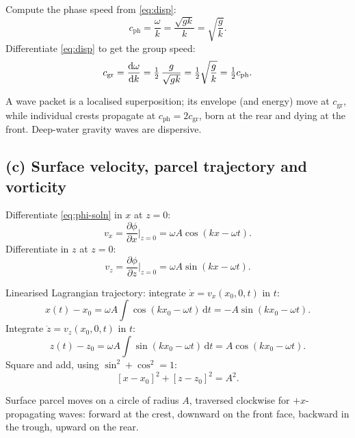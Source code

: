 \documentclass[11pt]{article}
\newcommand{\de}{\mathrm{d}}
\newcommand{\pd}[2]{\frac{\partial #1}{\partial #2}}
\begin{document}
Compute the phase speed from \eqref{eq:disp}:
\[ c_\text{ph} = \frac{\omega}{k} = \frac{\sqrt{gk}}{k} = \sqrt{\frac{g}{k}}. \]
Differentiate \eqref{eq:disp} to get the group speed:
\[ c_\text{gr} = \dv{\omega}{k} = \tfrac12\,\frac{g}{\sqrt{gk}} = \tfrac12\sqrt{\frac{g}{k}} = \tfrac12 c_\text{ph}. \]

\begin{center}
\end{center}
A wave packet is a localised superposition; its envelope (and energy) move at $c_\text{gr}$, while individual crests propagate at $c_\text{ph}=2c_\text{gr}$, born at the rear and dying at the front. Deep-water gravity waves are dispersive.

\subsection*{(c) Surface velocity, parcel trajectory and vorticity}

Differentiate \eqref{eq:phi-soln} in $x$ at $z=0$:
\[ v_x = \pd{\phi}{x}\bigg|_{z=0} = \omega A\cos(kx-\omega t). \]
Differentiate in $z$ at $z=0$:
\[ v_z = \pd{\phi}{z}\bigg|_{z=0} = \omega A\sin(kx-\omega t). \]

Linearised Lagrangian trajectory: integrate $\dot x = v_x(x_0,0,t)$ in $t$:
\[ x(t)-x_0 = \omega A\int\cos(kx_0-\omega t)\,\de t = -A\sin(kx_0-\omega t). \]
Integrate $\dot z = v_z(x_0,0,t)$ in $t$:
\[ z(t)-z_0 = \omega A\int\sin(kx_0-\omega t)\,\de t = A\cos(kx_0-\omega t). \]
Square and add, using $\sin^2+\cos^2=1$:
\[ [x-x_0]^2 + [z-z_0]^2 = A^2. \]

\begin{center}
\end{center}
Surface parcel moves on a circle of radius $A$, traversed clockwise for $+x$-propagating waves: forward at the crest, downward on the front face, backward in the trough, upward on the rear.
\end{document}
